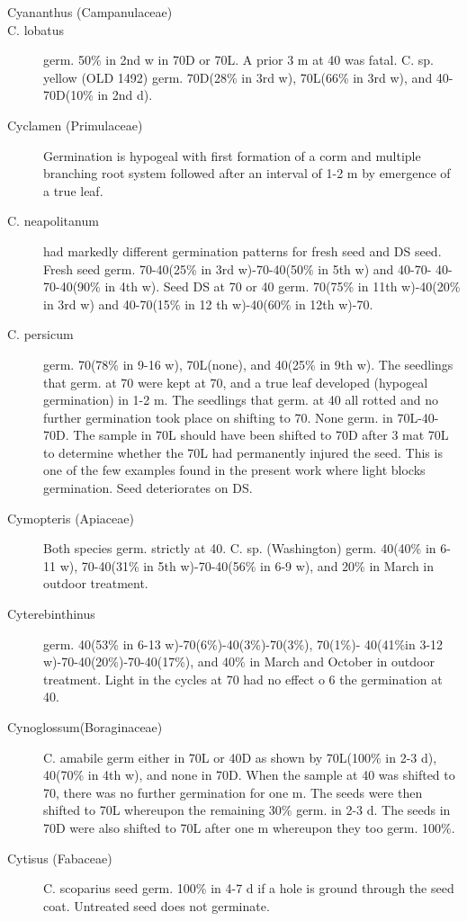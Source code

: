 \begin{description}
\item[Cyananthus (Campanulaceae)]
\item[C. lobatus] germ. 50\% in 2nd w in 70D or 70L. A prior 3 m at 40 was fatal.
C. sp. yellow (OLD 1492) germ. 70D(28\% in 3rd w), 70L(66\% in 3rd w), and 40-
70D(10\% in 2nd d).
\item[Cyclamen (Primulaceae)] Germination is hypogeal with first formation of a
corm and multiple branching root system followed after an interval of 1-2 m by
emergence of a true leaf.
\item[C. neapolitanum] had markedly different germination patterns for fresh seed
and DS seed. Fresh seed germ. 70-40(25\% in 3rd w)-70-40(50\% in 5th w) and 40-70-
40-70-40(90\% in 4th w). Seed DS at 70 or 40 germ. 70(75\% in 11th w)-40(20\% in 3rd
w) and 40-70(15\% in 12 th w)-40(60\% in 12th w)-70.

\item[C. persicum] germ. 70(78\% in 9-16 w), 70L(none), and 40(25\% in 9th w). The
seedlings that germ. at 70 were kept at 70, and a true leaf developed (hypogeal
germination) in 1-2 m. The seedlings that germ. at 40 all rotted and no further
germination took place on shifting to 70. None germ. in 70L-40-70D. The sample in
70L should have been shifted to 70D after 3 mat 70L to determine whether the 70L
had permanently injured the seed. This is one of the few examples found in the
present work where light blocks germination. Seed deteriorates on DS.

\item[Cymopteris (Apiaceae)] Both species germ. strictly at 40.
C. sp. (Washington) germ. 40(40\% in 6-11 w), 70-40(31\% in 5th w)-70-40(56\%
in 6-9 w), and 20\% in March in outdoor treatment.

\item[Cyterebinthinus] germ. 40(53\% in 6-13 w)-70(6\%)-40(3\%)-70(3\%), 70(1\%)-
40(41\%in 3-12 w)-70-40(20\%)-70-40(17\%), and 40\% in March and October in outdoor
treatment. Light in the cycles at 70 had no effect o 6 the germination at 40.

\item[Cynoglossum(Boraginaceae)] C. amabile germ either in 70L or 40D as
shown by 70L(100\% in 2-3 d), 40(70\% in 4th w), and none in 70D. When the sample
at 40 was shifted to 70, there was no further germination for one m. The seeds were
then shifted to 70L whereupon the remaining 30\% germ. in 2-3 d. The seeds in 70D
were also shifted to 70L after one m whereupon they too germ. 100\%.

\item[Cytisus (Fabaceae)] C. scoparius seed germ. 100\% in 4-7 d if a hole is
ground through the seed coat. Untreated seed does not germinate.

\end{description}
